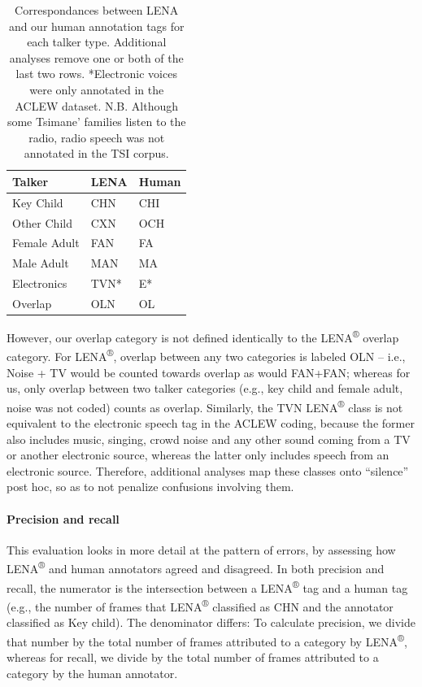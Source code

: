 \documentclass[english,table,man,floatsintext]{apa6}
\let\oldparagraph\paragraph
\renewcommand{\paragraph}[1]{\oldparagraph{#1}\mbox{}}
\begin{document}
\begin{table}[t]

\caption{\label{tab:tab-tsicor}Correspondances between LENA and our human annotation tags for each talker type. Additional analyses remove one or both of the last two rows. *Electronic voices were only annotated in the ACLEW dataset. N.B. Although some Tsimane' families listen to the radio, radio speech was not annotated in the TSI corpus.}
\centering
\begin{tabular}{>{\raggedright\arraybackslash}p{4cm}>{\raggedright\arraybackslash}p{2cm}>{\raggedright\arraybackslash}p{2cm}}
\toprule
Talker & LENA & Human\\
\midrule
Key Child & CHN & CHI\\
Other Child & CXN & OCH\\
Female Adult & FAN & FA\\
Male Adult & MAN & MA\\
Electronics & TVN* & E*\\
\addlinespace
Overlap & OLN & OL\\
\bottomrule
\end{tabular}
\end{table}

However, our overlap category is not defined identically to the LENA\textsuperscript{®} overlap category. For LENA\textsuperscript{®}, overlap between any two categories is labeled OLN -- i.e., Noise + TV would be counted towards overlap as would FAN+FAN; whereas for us, only overlap between two talker categories (e.g., key child and female adult, noise was not coded) counts as overlap. Similarly, the TVN LENA\textsuperscript{®} class is not equivalent to the electronic speech tag in the ACLEW coding, because the former also includes music, singing, crowd noise and any other sound coming from a TV or another electronic source, whereas the latter only includes speech from an electronic source. Therefore, additional analyses map these classes onto \enquote{silence} post hoc, so as to not penalize confusions involving them.

\hypertarget{precision-and-recall}{%
\paragraph{Precision and recall}\label{precision-and-recall}}

This evaluation looks in more detail at the pattern of errors, by assessing how LENA\textsuperscript{®} and human annotators agreed and disagreed. In both precision and recall, the numerator is the intersection between a LENA\textsuperscript{®} tag and a human tag (e.g., the number of frames that LENA\textsuperscript{®} classified as CHN and the annotator classified as Key child). The denominator differs: To calculate precision, we divide that number by the total number of frames attributed to a category by LENA\textsuperscript{®}, whereas for recall, we divide by the total number of frames attributed to a category by the human annotator.
\end{document}
